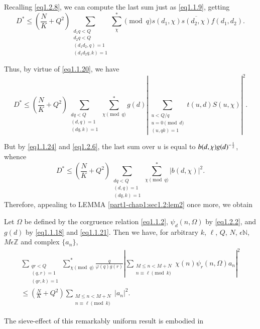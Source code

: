  Recalling \eqref{eq1.2.8}, we can compute the last sum just as
 \eqref{eq1.1.9}, getting 
 $$
 D^*\leq \left(\frac{N}{K}+Q^2\right) \sum_{\substack{d_1 q<Q\\ d_2 q<Q\\(d_1 
     d_2,q)=1\\(d_1 d_2 q,k)=1}}\sum^*_\chi\pmod{q}
 s(d_1,\chi)\overline{s(d_2,\chi)}f(d_1,d_2).   
$$
 
 Thus, by virtue of \eqref{eq1.1.20}, we have 
 $$
 D^*\leq \left(\frac{N}{K}+Q^2\right) \sum_{\substack{dq<Q\\(d,q)=1\\(dq,k)=1}}
 \sum^*_{\chi\pmod{q}} g(d)|\sum_{\substack{u<Q/q\\u=0
     \pmod{d}\\ (u,qk)=1}} t(u,d)S(u,\chi)|^2.  
 $$
 
 But by \eqref{eq1.1.24} and \eqref{eq1.2.6}, the last sum
 over $u$ is equal to 
 $b(d,\chi)\break g(d)^{-\frac{1}{2}}$, whence 
 $$
 D^*\leq \left(\frac{N}{K}+Q^2\right)\sum_{\substack{dq<Q\\(d,q)=1\\(dq,k)=1}} 
 \sum^*_{\chi\pmod{q}}|b(d,\chi)|^2.  
 $$
 Therefore, appealing to LEMMA \ref{part1-chap1:sec1.2:lem2} once
 more, we obtain  

\begin{theorem}\label{part1-chap1:sec1.2:thm3}  
Let $\Omega$ be
  defined by the corgruence relation \eqref{eq1.1.2},
  $\psi_d(n,\Omega)$ by 
  \eqref{eq1.2.2}, and $g(d)$ by \eqref{eq1.1.18} and
  \eqref{eq1.1.21}. Then we have, 
  for arbitrary  $k$, $\ell$, $Q$, $N$, $\epsilon \mathbb{N}$, $M
  \epsilon \mathbb{Z}$ and complex $\{a_n\}$,  
\begin{align*}
  \sum_{\substack{qr<Q\\(q,r)=1\\(qr,k)=1}}\sum^*_{\chi
    \pmod{q}}\frac{q}{\varphi(q)g(r)}| \sum_{\substack{M\leq
      n<M+N\\ n\equiv \ell \pmod{k}}} \chi
  (n)\psi_r(n,\Omega)a_n|^2 \\
  \leq \left(\frac{N}{K}+Q^2\right)\sum_{\substack{M\leq n<M+N\\n\equiv
      \ell \pmod{k}}}|a_n|^2. 
\end{align*}
 \end{theorem}\pageoriginale
 The sieve-effect of this remarkably uniform result is embodied in 
 
